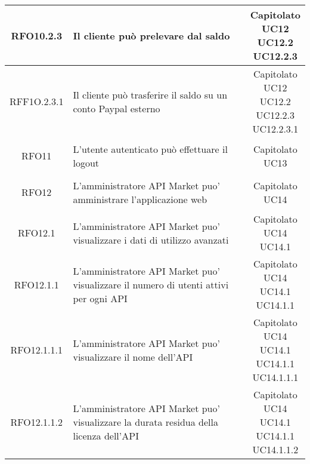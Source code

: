 \begin{longtable}{|c|p{8cm}|c|}
\hypertarget{RFO10.2.3}{RFO10.2.3} &  Il cliente può prelevare dal saldo & \makecell*{Capitolato\\UC12\\UC12.2\\UC12.2.3} \\
\hline

\hypertarget{RFF10.2.3.1}{RFF1O.2.3.1} &  Il cliente può trasferire il saldo su un conto Paypal esterno & \makecell*{Capitolato\\UC12\\UC12.2\\UC12.2.3\\UC12.2.3.1} \\
\hline

\hypertarget{RFO11}{RFO11} & L'utente autenticato può effettuare il logout & \makecell*{Capitolato\\UC13} \\
\hline

\hypertarget{RFO12}{RFO12} &  L'amministratore API Market puo' amministrare l'applicazione web & \makecell*{Capitolato\\UC14} \\
\hline

\hypertarget{RFO12.1}{RFO12.1} &  L'amministratore API Market puo' visualizzare i dati di utilizzo avanzati & \makecell*{Capitolato\\UC14\\UC14.1} \\
\hline

\hypertarget{RFO12.1.1}{RFO12.1.1} &  L'amministratore API Market puo' visualizzare il numero di utenti attivi per ogni API & \makecell*{Capitolato\\UC14\\UC14.1\\UC14.1.1} \\
\hline

\hypertarget{RFO12.1.1.1}{RFO12.1.1.1} &  L'amministratore API Market puo' visualizzare il nome dell'API & \makecell*{Capitolato\\UC14\\UC14.1\\UC14.1.1\\UC14.1.1.1} \\
\hline

\hypertarget{RFO12.1.1.2}{RFO12.1.1.2} &  L'amministratore API Market puo' visualizzare la durata residua della licenza dell'API & \makecell*{Capitolato\\UC14\\UC14.1\\UC14.1.1\\UC14.1.1.2} \\
\hline


\end{longtable}
